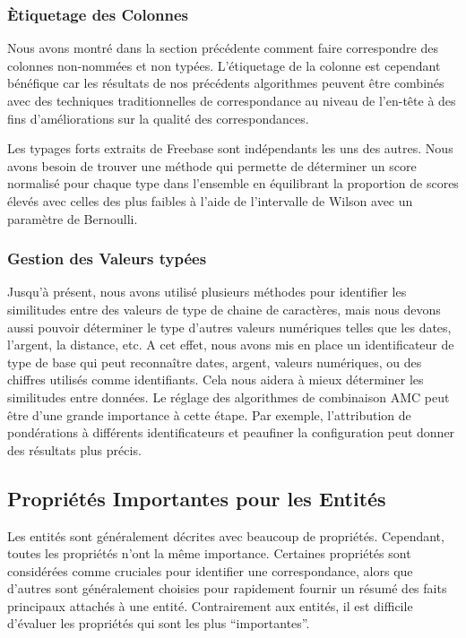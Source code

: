 \subsubsection{\`{E}tiquetage des Colonnes}

Nous avons montr\'{e} dans la section pr\'{e}c\'{e}dente comment faire correspondre des colonnes non-nomm\'{e}es et non typ\'{e}es. L'\'{e}tiquetage de la colonne est cependant b\'{e}n\'{e}fique car les r\'{e}sultats de nos pr\'{e}c\'{e}dents algorithmes peuvent être combin\'{e}s avec des techniques traditionnelles de correspondance au niveau de l'en-tête à des fins d'am\'{e}liorations sur la qualit\'{e} des correspondances.

Les typages forts extraits de Freebase sont ind\'{e}pendants les uns des autres. Nous avons besoin de trouver une m\'{e}thode qui permette de d\'{e}terminer un score normalis\'{e} pour chaque type dans l'ensemble en \'{e}quilibrant la proportion de scores \'{e}lev\'{e}s avec celles des plus faibles à l'aide de l'intervalle de Wilson avec un param\`{e}tre de Bernoulli.

\subsubsection{Gestion des Valeurs typ\'{e}es}

Jusqu'à pr\'{e}sent, nous avons utilis\'{e} plusieurs m\'{e}thodes pour identifier les similitudes entre des valeurs de type de chaine de caract\`{e}res, mais nous devons aussi pouvoir d\'{e}terminer le type d'autres valeurs num\'{e}riques telles que les dates, l'argent, la distance, etc. A cet effet, nous avons mis en place un identificateur de type de base qui peut reconnaître dates, argent, valeurs num\'{e}riques, ou des chiffres utilis\'{e}s comme identifiants. Cela nous aidera à mieux d\'{e}terminer les similitudes entre donn\'{e}es. Le r\'{e}glage des algorithmes de combinaison AMC peut être d'une grande importance à cette \'{e}tape. Par exemple, l'attribution de pond\'{e}rations à diff\'{e}rents identificateurs et peaufiner la configuration peut donner des r\'{e}sultats plus pr\'{e}cis.

\subsection{Propri\'{e}t\'{e}s Importantes pour les Entit\'{e}s}

Les entit\'{e}s sont g\'{e}n\'{e}ralement d\'{e}crites avec beaucoup de propri\'{e}t\'{e}s. Cependant, toutes les propri\'{e}t\'{e}s n'ont la même importance. Certaines propri\'{e}t\'{e}s sont consid\'{e}r\'{e}es comme cruciales pour identifier une correspondance, alors que d'autres sont g\'{e}n\'{e}ralement choisies pour rapidement fournir un r\'{e}sum\'{e} des faits principaux attach\'{e}s à une entit\'{e}. Contrairement aux entit\'{e}s, il est difficile d'\'{e}valuer les propri\'{e}t\'{e}s qui sont les plus ``importantes''.

